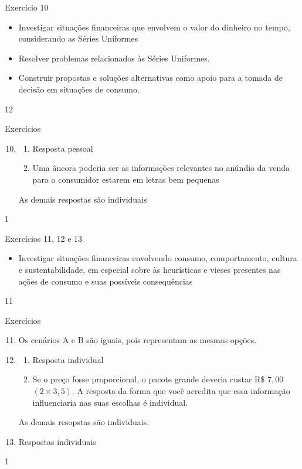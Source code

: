 \begin{objectives}{Exercício 10}
{
\begin{itemize}
\item Investigar situações financeiras que envolvem o valor do dinheiro no tempo, considerando as Séries Uniformes
\item Resolver problemas relacionados às Séries Uniformes.
\item Construir propostas e soluções alternativas como apoio para a tomada de decisão em situações de consumo.
\end{itemize}
}{1}{2}
\end{objectives}
\begin{answer}{Exercícios}
{\exerciselist

  \begin{enumerate}\setcounter{enumi}{9}
  \item
  \begin{enumerate}
    \item Resposta pessoal
    \item Uma âncora poderia ser as informaçòes relevantes no anúndio da venda para o consumidor estarem em letras bem pequenas
  \end{enumerate}
  As demais respostas são individuais
\end{enumerate}
}{1}
\end{answer}

\clearmargin
\begin{objectives}{Exercícios 11, 12 e 13}
{
\begin{itemize}
\item Investigar situações financeiras envolvendo consumo, comportamento, cultura e sustentabilidade, em especial sobre às heurísticas e vieses presentes nas ações de consumo e suas possíveis consequências
\end{itemize}
}{1}{1}
\end{objectives}
\begin{answer}{Exercícios}
{\exerciselist

  \begin{enumerate}\setcounter{enumi}{10}
    \item Os cenários A e B são iguais, pois representam as mesmas opções.
    \item
    \begin{enumerate}
      \item Resposta individual
      \item Se o preço fosse proporcional, o pacote grande deveria custar R\$ $7{,}00$ $(2\times3{,}5)$. A resposta da forma que você acredita que essa informação influenciaria nas suas escolhas é individual.
    \end{enumerate}
    As demais resopstas são individuais.
    \item Respostas individuais
  \end{enumerate}
}{1}
\end{answer}
\clearmargin

